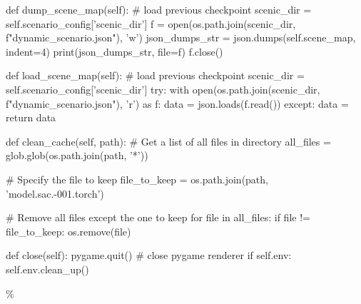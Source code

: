 \begin{appendix}
def dump\_scene\_map(self):
\# load previous checkpoint
scenic\_dir = self.scenario\_config['scenic\_dir']
f = open(os.path.join(scenic\_dir, f"dynamic\_scenario.json"), 'w')
json\_dumps\_str = json.dumps(self.scene\_map, indent=4)
print(json\_dumps\_str, file=f)
f.close()

def load\_scene\_map(self):
\# load previous checkpoint
scenic\_dir = self.scenario\_config['scenic\_dir']
try:
with open(os.path.join(scenic\_dir, f"dynamic\_scenario.json"), 'r') as f:
data = json.loads(f.read())
except:
data = {}
return data

def clean\_cache(self, path):
\# Get a list of all files in directory
all\_files = glob.glob(os.path.join(path, '*'))

\# Specify the file to keep
file\_to\_keep = os.path.join(path, 'model.sac.-001.torch')

\# Remove all files except the one to keep
for file in all\_files:
if file != file\_to\_keep:
os.remove(file)

def close(self):
pygame.quit() \# close pygame renderer
if self.env:
self.env.clean\_up()




\% \end{appendix}
